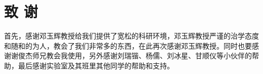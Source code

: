 \chapter*{致\texorpdfstring{\qquad}{} 谢}
\thispagestyle{main}
\par 首先，感谢邓玉辉教授给我们提供了宽松的科研环境，邓玉辉教授严谨的治学态度和随和的为人，教会了我们非常多的东西，在此再次感谢邓玉辉教授。同时也要感谢谢俊杰师兄教会我使用\LaTeXe{}，另外感谢刘瑞锴、杨儒、刘冰星、甘顺仪等小伙伴的帮助，最后感谢实验室及其班里其他同学的帮助和支持。
